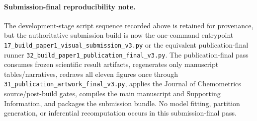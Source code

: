 \paragraph{Submission-final reproducibility note.}
The development-stage script sequence recorded above is retained for provenance, but the authoritative submission build is now the one-command entrypoint \texttt{17\_build\_paper1\_visual\_submission\_v3.py} or the equivalent publication-final runner \texttt{32\_build\_paper1\_publication\_final\_v3.py}. The publication-final pass consumes frozen scientific result artifacts, regenerates only manuscript tables/narratives, redraws all eleven figures once through \texttt{31\_publication\_artwork\_final\_v3.py}, applies the Journal of Chemometrics source/post-build gates, compiles the main manuscript and Supporting Information, and packages the submission bundle. No model fitting, partition generation, or inferential recomputation occurs in this submission-final pass.
